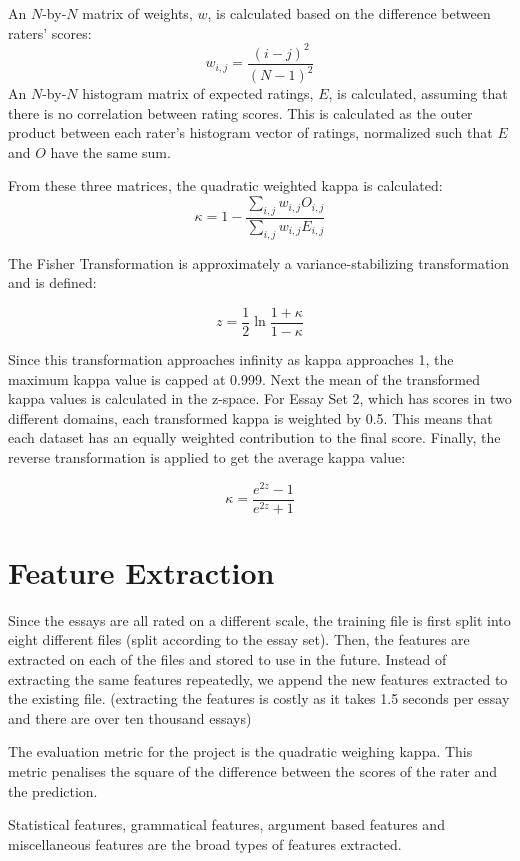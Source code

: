\documentclass[BTech]{nitkdiss}
\begin{document}
An $N$-by-$N$ matrix of weights, $w$, is calculated based on the difference between raters’ scores:
$$w_{i,j} = \frac{(i-j)^2}{(N-1)^2}$$
An $N$-by-$N$ histogram matrix of expected ratings, $E$, is calculated, assuming that there is no correlation between rating scores.  This is calculated as the outer product between each rater’s histogram vector of ratings, normalized such that $E$ and $O$ have the same sum.

From these three matrices, the quadratic weighted kappa is calculated: 
$$\kappa = 1 - \frac{\sum_{i,j}^{}w_{i,j}O_{i,j}}{\sum_{i,j}^{}w_{i,j}E_{i,j}}$$

The Fisher Transformation is approximately a variance-stabilizing transformation and is defined:

$$z=\frac{1}{2}\ln{\frac{1+\kappa}{1 - \kappa}}$$

Since this transformation approaches infinity as kappa approaches 1, the maximum kappa value is capped at 0.999.  Next the mean of the transformed kappa values is calculated in the z-space.  For Essay Set 2, which has scores in two different domains, each transformed kappa is weighted by 0.5.  This means that each dataset has an equally weighted contribution to the final score.  Finally, the reverse transformation is applied to get the average kappa value:

$$ \kappa=\frac{e^{2z}-1}{e^{2z}+1}$$

\chapter{Feature Extraction}
Since the essays are all rated on a different scale, the training file is first split into eight different files (split according to the essay set). Then, the features are extracted on each of the files and stored to use in the future. Instead of extracting the same features repeatedly, we append the new features extracted to the existing file. (extracting the features is costly as it takes 1.5 seconds per essay and there are over ten thousand essays)

The evaluation metric for the project is the quadratic weighing kappa. This metric penalises the square of the difference between the scores of the rater and the prediction. 

Statistical features, grammatical features, argument based features and miscellaneous features are the broad types of features extracted.
\end{document}
